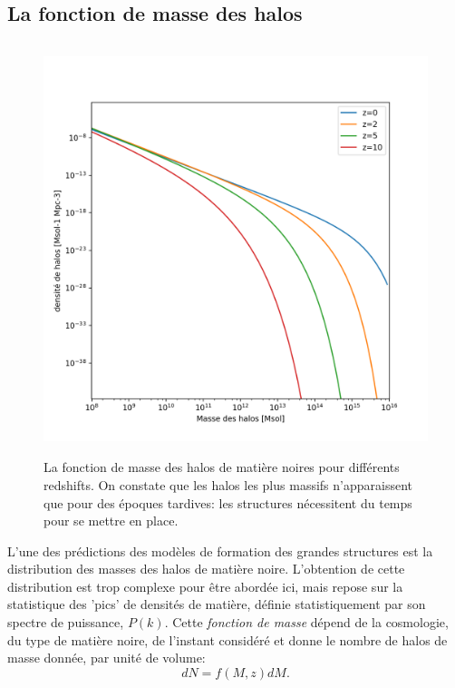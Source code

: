 \subsection{La fonction de masse des halos}
\begin{figure}[htbp]
	\centering
		\includegraphics[height=12cm]{figs/hmf.png}
	\caption{La fonction de masse des halos de matière noires pour différents redshifts. On constate que les halos les plus massifs n'apparaissent que pour des époques tardives: les structures nécessitent du temps pour se mettre en place.} 
	\label{f:hmf}
\end{figure}
L'une des prédictions des modèles de formation des grandes structures est la distribution des masses des halos de matière noire. L'obtention de cette distribution est trop complexe pour être abordée ici, mais repose sur la statistique des 'pics' de densités de matière, définie statistiquement par son spectre de puissance, $P(k)$. Cette \textit{fonction de masse} dépend de la cosmologie, du type de matière noire, de l'instant considéré et donne le nombre de halos de masse donnée, par unité de volume:
\begin{equation}
dN=f(M,z)dM.
\end{equation}
